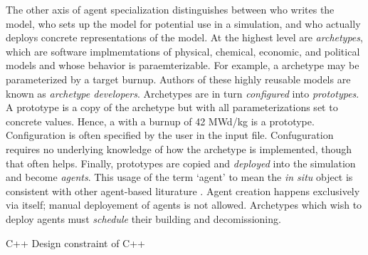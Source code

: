 The other axis of agent specialization distinguishes between who 
writes the model, who sets up the model for potential use in a simulation,
and who actually deploys concrete representations of the model.
At the highest level are \emph{archetypes}, which are software implmemtations
of physical, chemical, economic, and political models and whose behavior
is paraemterizable. For example, a  archetype may be 
parameterized by a target burnup. Authors of these highly reusable models 
are known as \emph{archetype developers}. Archetypes are in turn 
\emph{configured} into \emph{prototypes}. A prototype is a copy 
of the archetype but with all parameterizations set to concrete 
values. Hence, a  with a burnup of 42 MWd/kg is a 
prototype. Configuration is often specified by the \cyclus user 
in the input file. Confuguration requires no underlying knowledge of 
how the archetype is implemented, though that often helps.
Finally, prototypes are copied and \emph{deployed} into the simulation 
and become \emph{agents}. This usage of the term `agent' to mean 
the \emph{in situ} object is consistent with other agent-based
liturature \citeme.  Agent creation happens exclusively via 
\cyclus itself; manual deployement of agents is not allowed.
Archetypes which wish to deploy agents must \emph{schedule} their building
and decomissioning.

C++ Design constraint of C++
